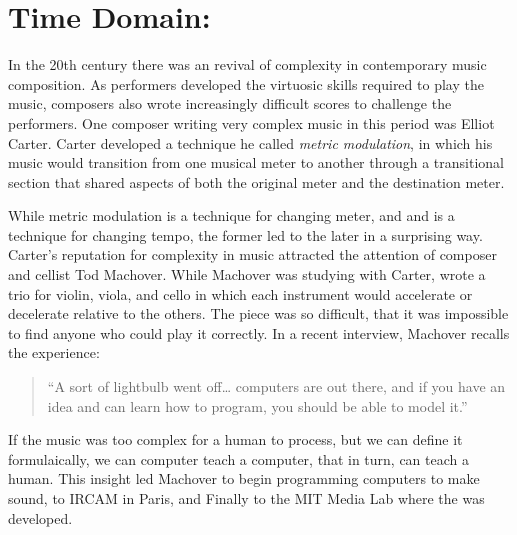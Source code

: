 \chapter{Time Domain: \polytempic}
\label{ch:polytempic}
In the 20th century there was an revival of complexity in contemporary
music composition. As performers developed the
virtuosic skills required to play the music, composers also wrote
increasingly difficult scores to challenge the
performers.\cite{grout2006} One composer writing very complex music in
this period was Elliot Carter. Carter developed a technique he called
\textit{metric modulation}, in which his music would transition from
one musical meter to another through a transitional section that
shared aspects of both the original meter and the destination
meter.

While metric modulation is a technique for changing meter, and
and \polytempic is a technique for changing tempo, the former led to
the later in a surprising way. Carter's reputation for complexity in
music attracted the attention of composer and cellist Tod
Machover. While Machover was studying with Carter, wrote a trio for
violin, viola, and cello in which each instrument would accelerate or
decelerate relative to the others. The piece was so difficult, that
it was impossible to find anyone who could play it correctly. In a
recent interview, Machover recalls the experience:
\begin{quotation}``A sort of lightbulb went off\ldots{} computers are out
  there, and if you have an idea and can learn how to program, you
  should be able to model it.''\cite{Fein2014}
\end{quotation}
If the music was too complex for a human to process, but we can define
it formulaically, we can computer teach a computer, that in turn, can
teach a human. This insight led Machover to begin programming
computers to make sound, to IRCAM in Paris, and Finally to the MIT
Media Lab where the \polytempic was developed.

